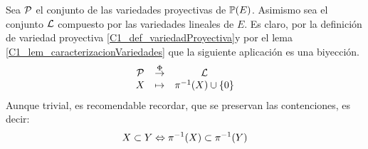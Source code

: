 \begin{obs}
	\label{C1_obs_lemaCorrespondencia}
	Sea $\mathcal{P}$ el conjunto de las variedades proyectivas de $\mathbb{P}(E)$. Asimismo sea el conjunto $\mathcal{L}$ compuesto por las variedades lineales de $E$. Es claro, por la definición de variedad proyectiva \ref{C1_def_variedadProyectiva}y por el lema \ref{C1_lem_caracterizacionVariedades} que la siguiente aplicación es una biyección.
	\[
		\begin{array}{ccc}
		\mathcal{P} & \stackrel{\Phi}{\to} & \mathcal{L}\\
		X & \mapsto & \pi^{-1}(X)\cup\{0\}
		\end{array}
	\]
	Aunque trivial, es recomendable recordar, que se preservan las contenciones, es decir:
	\[X\subset Y \Leftrightarrow \pi^{-1}(X)\subset \pi^{-1}(Y)\]
\end{obs}
